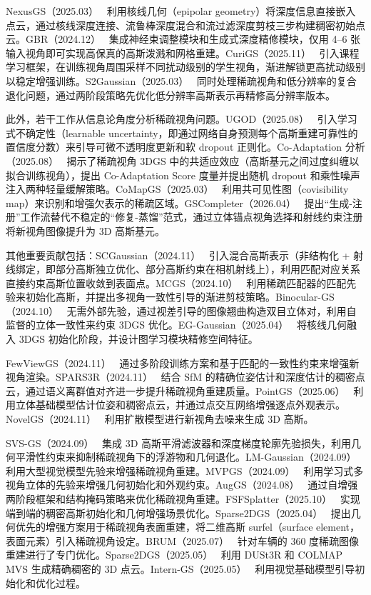 NexusGS（2025.03）~\cite{2503_18794} 利用核线几何（epipolar geometry）将深度信息直接嵌入点云，通过核线深度连接、流鲁棒深度混合和流过滤深度剪枝三步构建稠密初始点云。GBR（2024.12）~\cite{2412_05908} 集成神经束调整模块和生成式深度精修模块，仅用 4--6 张输入视角即可实现高保真的高斯泼溅和网格重建。CuriGS（2025.11）~\cite{2511_16030} 引入课程学习框架，在训练视角周围采样不同扰动级别的学生视角，渐进解锁更高扰动级别以稳定增强训练。S2Gaussian（2025.03）~\cite{2503_04314} 同时处理稀疏视角和低分辨率的复合退化问题，通过两阶段策略先优化低分辨率高斯表示再精修高分辨率版本。

此外，若干工作从信息论角度分析稀疏视角问题。UGOD（2025.08）~\cite{2508_04968} 引入学习式不确定性（learnable uncertainty，即通过网络自身预测每个高斯重建可靠性的置信度分数）来引导可微不透明度更新和软 dropout 正则化。Co-Adaptation 分析（2025.08）~\cite{2508_12720} 揭示了稀疏视角 3DGS 中的共适应效应（高斯基元之间过度纠缠以拟合训练视角），提出 Co-Adaptation Score 度量并提出随机 dropout 和乘性噪声注入两种轻量缓解策略。CoMapGS（2025.03）~\cite{2503_20998} 利用共可见性图（covisibility map）来识别和增强欠表示的稀疏区域。GSCompleter（2026.04）~\cite{2604_20155} 提出``生成-注册''工作流替代不稳定的``修复-蒸馏''范式，通过立体锚点视角选择和射线约束注册将新视角图像提升为 3D 高斯基元。

其他重要贡献包括：SCGaussian（2024.11）~\cite{2411_03637} 引入混合高斯表示（非结构化 + 射线绑定，即部分高斯独立优化、部分高斯约束在相机射线上），利用匹配对应关系直接约束高斯位置收敛到表面点。MCGS（2024.10）~\cite{2410_11394} 利用稀疏匹配器的匹配先验来初始化高斯，并提出多视角一致性引导的渐进剪枝策略。Binocular-GS（2024.10）~\cite{2410_18822} 无需外部先验，通过视差引导的图像翘曲构造双目立体对，利用自监督的立体一致性来约束 3DGS 优化。EG-Gaussian（2025.04）~\cite{2504_13540} 将核线几何融入 3DGS 初始化阶段，并设计图学习模块精修空间特征。

FewViewGS（2024.11）~\cite{2411_02229} 通过多阶段训练方案和基于匹配的一致性约束来增强新视角渲染。SPARS3R（2024.11）~\cite{2411_12592} 结合 SfM 的精确位姿估计和深度估计的稠密点云，通过语义离群值对齐进一步提升稀疏视角重建质量。PointGS（2025.06）~\cite{2506_10335} 利用立体基础模型估计位姿和稠密点云，并通过点交互网络增强逐点外观表示。NovelGS（2024.11）~\cite{2411_16779} 利用扩散模型进行新视角去噪来生成 3D 高斯。

SVS-GS（2024.09）~\cite{2409_03213} 集成 3D 高斯平滑滤波器和深度梯度轮廓先验损失，利用几何平滑性约束来抑制稀疏视角下的浮游物和几何退化。LM-Gaussian（2024.09）~\cite{2409_03456} 利用大型视觉模型先验来增强稀疏视角重建。MVPGS（2024.09）~\cite{2409_14316} 利用学习式多视角立体的先验来增强几何初始化和外观约束。AugGS（2024.08）~\cite{2408_04831} 通过自增强两阶段框架和结构掩码策略来优化稀疏视角重建。FSFSplatter（2025.10）~\cite{2510_02691} 实现端到端的稠密高斯初始化和几何增强场景优化。Sparse2DGS（2025.04）~\cite{2504_20378} 提出几何优先的增强方案用于稀疏视角表面重建，将二维高斯 surfel（surface element，表面元素）引入稀疏视角设定。BRUM（2025.07）~\cite{2507_12095} 针对车辆的 360 度稀疏图像重建进行了专门优化。Sparse2DGS（2025.05）~\cite{2505_19854} 利用 DUSt3R 和 COLMAP MVS 生成精确稠密的 3D 点云。Intern-GS（2025.05）~\cite{2505_20729} 利用视觉基础模型引导初始化和优化过程。

